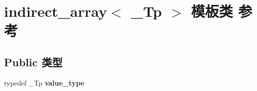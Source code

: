 \hypertarget{classindirect__array}{}\section{indirect\+\_\+array$<$ \+\_\+\+Tp $>$ 模板类 参考}
\label{classindirect__array}
\subsection*{Public 类型}
\begin{DoxyCompactItemize}
\item 
\mbox{\label{classindirect__array_a485a346d681dbef0dae36664fb9cef21}} 
typedef \+\_\+\+Tp {\bfseries value\+\_\+type}
\end{DoxyCompactItemize}
